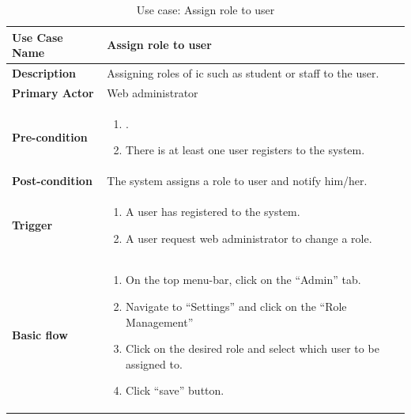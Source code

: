 \begin{table}
	\centering
	\caption{Use case: Assign role to user}
	\begin{tabular}{|l|L{9cm}|}
		\hline
		\textbf{Use Case Name} & Assign role to user \\
		\hline
		
		\textbf{Description} & Assigning roles of \gls{ic} such as student or staff to the user. \\
		\textbf{Primary Actor} & Web administrator \\
		\textbf{Pre-condition} & 
		\begin{enumerate}
			\item \alreadylogin.
			\item There is at least one user registers to the system.
		\end{enumerate} \\
		\textbf{Post-condition} & The system assigns a role to user and notify him/her. \\
		\textbf{Trigger} & 
		\begin{enumerate}
			\item A user has registered to the system.
			\item A user request web administrator to change a role.
		\end{enumerate}\\
		\textbf{Basic flow} & 
		\begin{enumerate}
			\item On the top menu-bar, click on the \enquote{Admin} tab.
			\item Navigate to \enquote{Settings} and click on the \enquote{Role Management}
			\item Click on the desired role and select which user to be assigned to.
			\item Click \enquote{save} button.
		\end{enumerate} \\
		\hline
	\end{tabular}
\end{table}

